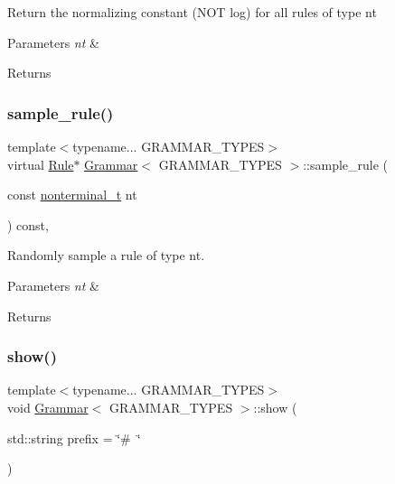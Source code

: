 Return the normalizing constant (N\+OT log) for all rules of type nt 
\begin{DoxyParams}{Parameters}
{\em nt} & \\
\hline
\end{DoxyParams}
\begin{DoxyReturn}{Returns}

\end{DoxyReturn}
\mbox{\label{class_grammar_aba4d092714b8420d8c0a1be63e8566b6}} 
\subsubsection{\texorpdfstring{sample\+\_\+rule()}{sample\_rule()}}
{\footnotesize\ttfamily template$<$typename... G\+R\+A\+M\+M\+A\+R\+\_\+\+T\+Y\+P\+ES$>$ \\
virtual \hyperlink{class_rule}{Rule}$\ast$ \hyperlink{class_grammar}{Grammar}$<$ G\+R\+A\+M\+M\+A\+R\+\_\+\+T\+Y\+P\+ES $>$\+::sample\+\_\+rule (\begin{DoxyParamCaption}\item[{const \hyperlink{_nonterminal_8h_a5c1f658dc7560600a16d22408bd716ca}{nonterminal\+\_\+t}}]{nt }\end{DoxyParamCaption}) const\hspace{0.3cm}{\ttfamily [inline]}, {\ttfamily [virtual]}}

Randomly sample a rule of type nt. 
\begin{DoxyParams}{Parameters}
{\em nt} & \\
\hline
\end{DoxyParams}
\begin{DoxyReturn}{Returns}

\end{DoxyReturn}
\mbox{\label{class_grammar_a8d661258f08b7cc4d154d59bfbbc1f68}} 
\subsubsection{\texorpdfstring{show()}{show()}}
{\footnotesize\ttfamily template$<$typename... G\+R\+A\+M\+M\+A\+R\+\_\+\+T\+Y\+P\+ES$>$ \\
void \hyperlink{class_grammar}{Grammar}$<$ G\+R\+A\+M\+M\+A\+R\+\_\+\+T\+Y\+P\+ES $>$\+::show (\begin{DoxyParamCaption}\item[{std\+::string}]{prefix = {\ttfamily \char`\"{}\#~\char`\"{}} }\end{DoxyParamCaption})\hspace{0.3cm}{\ttfamily [inline]}}

